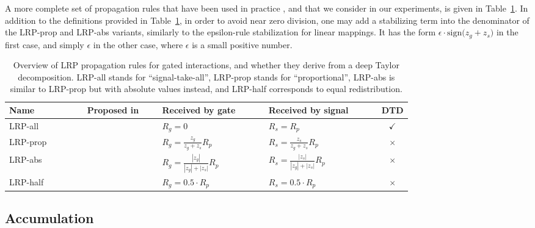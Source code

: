 \documentclass[runningheads]{llncs}
\begin{document}
A more complete set of propagation rules that have been used in practice \cite{Arr:Arjona-Medina:18,Arr:Arras:17,Arr:Ding:ACL2017,Arr:Poerner:ACL2018,Arr:rieger2018structuring,Arr:Yang:ICHI2018}, and that we consider in our experiments, is given in Table~\ref{Arr:tab:product_rule_overview}.
In addition to the definitions provided in Table~\ref{Arr:tab:product_rule_overview}, in order to avoid near zero division, one may add a stabilizing term into the denominator of the LRP-prop and LRP-abs variants, similarly to the epsilon-rule stabilization for linear mappings. It has the form
$\epsilon \cdot  \mathrm{sign}\big(z_g + z_s\big)$ in the first case, and simply $\epsilon$  in the other case, where $\epsilon$ is a small positive number.

\begin{table}
\centering 
\caption{Overview of LRP propagation rules for gated interactions, and whether they derive from a deep Taylor decomposition. LRP-all stands for ``signal-take-all'', LRP-prop stands for ``proportional'', LRP-abs is similar to LRP-prop but with absolute values instead, and LRP-half corresponds to equal redistribution.}
\begin{tabular}{llllc}\toprule
 Name~~~~~~~~~&
 Proposed in~~~&
 Received by gate~~~~~&
 Received by signal~~~~~&
 DTD\\\midrule
LRP-all &
\cite{Arr:Arras:17} &
$R_g = 0$ &
$R_s = R_p$ &
$\checkmark$ \\
%
LRP-prop &
\cite{Arr:Ding:ACL2017,Arr:Arjona-Medina:18}&
$R_g = \tfrac {z_g } {z_g + z_s } R_p$ &
$R_s = \tfrac {z_s } {z_g + z_s } R_p$ &
$\times$ \\
%
LRP-abs &
{}&
$R_g = \tfrac {|z_g| } {|z_g| + |z_s| } R_p $ &
$R_s = \tfrac {|z_s| } {|z_g| + |z_s| } R_p $  &
$\times$ \\
%
LRP-half &
\cite{Arr:Arjona-Medina:18} &
$R_g = 0.5 \cdot R_p $ &
$R_s = 0.5 \cdot R_p $ &
$\times$ \\
\bottomrule
\end{tabular}
\label{Arr:tab:product_rule_overview}
\end{table}


\subsection{Accumulation}
\label{Arr:sec:LRP_accumulation}
\end{document}
